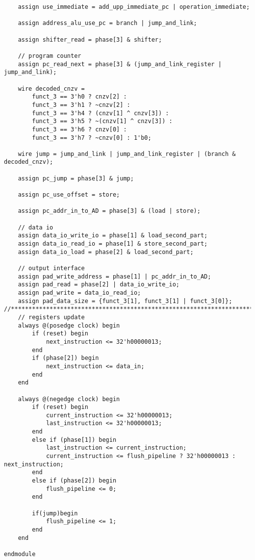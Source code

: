 \begin{lstlisting}
    assign use_immediate = add_upp_immediate_pc | operation_immediate;

    assign address_alu_use_pc = branch | jump_and_link;

    assign shifter_read = phase[3] & shifter;

    // program counter
    assign pc_read_next = phase[3] & (jump_and_link_register | jump_and_link);

    wire decoded_cnzv = 
        funct_3 == 3'h0 ? cnzv[2] : 
        funct_3 == 3'h1 ? ~cnzv[2] : 
        funct_3 == 3'h4 ? (cnzv[1] ^ cnzv[3]) : 
        funct_3 == 3'h5 ? ~(cnzv[1] ^ cnzv[3]) : 
        funct_3 == 3'h6 ? cnzv[0] : 
        funct_3 == 3'h7 ? ~cnzv[0] : 1'b0;

    wire jump = jump_and_link | jump_and_link_register | (branch & decoded_cnzv);

    assign pc_jump = phase[3] & jump;

    assign pc_use_offset = store;

    assign pc_addr_in_to_AD = phase[3] & (load | store);

    // data io
    assign data_io_write_io = phase[1] & load_second_part;
    assign data_io_read_io = phase[1] & store_second_part;
    assign data_io_load = phase[2] & load_second_part;

    // output interface
    assign pad_write_address = phase[1] | pc_addr_in_to_AD;
    assign pad_read = phase[2] | data_io_write_io;
    assign pad_write = data_io_read_io;
    assign pad_data_size = {funct_3[1], funct_3[1] | funct_3[0]};
//********************************************************************************************************************//
    // registers update
    always @(posedge clock) begin
        if (reset) begin
            next_instruction <= 32'h00000013;
        end
        if (phase[2]) begin
            next_instruction <= data_in;
        end
    end

    always @(negedge clock) begin
        if (reset) begin
            current_instruction <= 32'h00000013;
            last_instruction <= 32'h00000013;
        end
        else if (phase[1]) begin
            last_instruction <= current_instruction;
            current_instruction <= flush_pipeline ? 32'h00000013 : next_instruction;
        end
        else if (phase[2]) begin
            flush_pipeline <= 0;
        end

        if(jump)begin
            flush_pipeline <= 1;
        end
    end

endmodule



\end{lstlisting}
